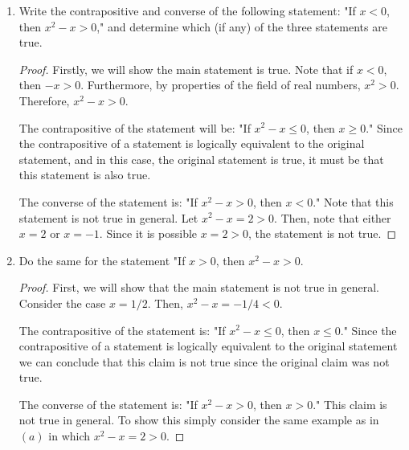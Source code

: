 \documentclass[12pt]{article}
\begin{document}
\begin{enumerate}[label=(\alph*)]
	\item Write the contrapositive and converse of the following statement: "If $x < 0$,
	then $x^2 - x > 0$," and determine which (if any) of the three statements are true.
	\begin{proof}
		Firstly, we will show the main statement is true. Note that if $x < 0$, then
		$-x > 0$. Furthermore, by properties of the field of real numbers, $x^2 > 0$.
		Therefore, $x^2 - x > 0$.
		
		The contrapositive of the statement will be: "If $x^2 - x \leq 0$, then $x \geq 0$."
		Since the contrapositive of a statement is logically equivalent to the original
		statement, and in this case, the original statement is true, it must be that
		this statement is also true.
		
		The converse of the statement is: "If $x^2 - x > 0$, then $x < 0$." Note that this 
		statement is not true in general. Let $x^2 - x = 2 > 0$. Then, note that 
		either $x = 2$ or $x = -1$. Since it is possible $x = 2 > 0$, the statement 
		is not true.
	\end{proof}
	\item Do the same for the statement "If $x > 0$, then $x^2 - x > 0$.
	\begin{proof}
		First, we will show that the main statement is not true in general. 
		Consider the case $x = 1/2$. Then, $x^2 - x = -1/4 < 0$.
		
		The contrapositive of the statement is: "If $x^2 - x \leq 0$, then $x \leq 0$."
		Since the contrapositive of a statement is logically equivalent to the original
		statement we can conclude that this claim is not true since the original claim
		was not true.
		
		The converse of the statement is: "If $x^2 - x > 0$, then $x > 0$." This claim
		is not true in general. To show this simply consider the same example as in
		$(a)$ in which $x^2 - x = 2 > 0$.
	\end{proof}
\end{enumerate}
\end{document}

